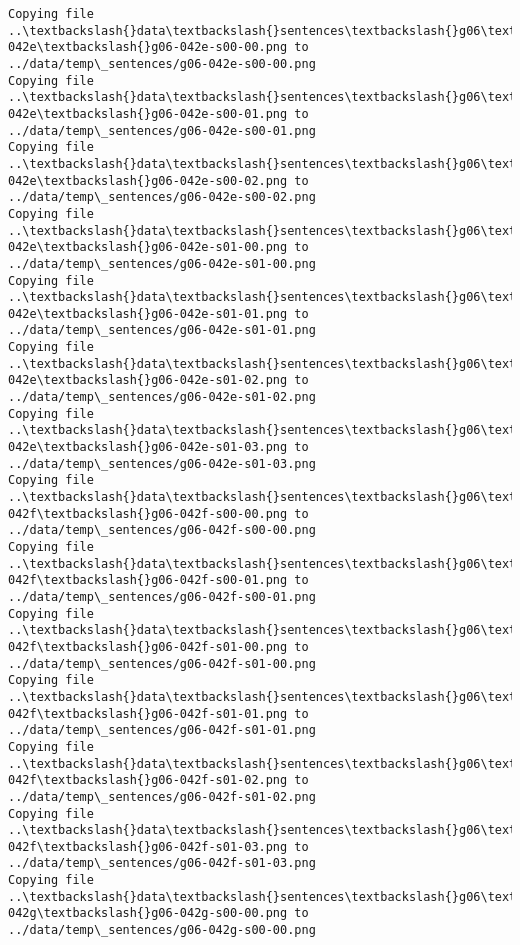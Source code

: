 \documentclass[11pt]{article}
\begin{document}
\begin{Verbatim}[commandchars=\\\{\}]
Copying file ..\textbackslash{}data\textbackslash{}sentences\textbackslash{}g06\textbackslash{}g06-042e\textbackslash{}g06-042e-s00-00.png to
../data/temp\_sentences/g06-042e-s00-00.png
Copying file ..\textbackslash{}data\textbackslash{}sentences\textbackslash{}g06\textbackslash{}g06-042e\textbackslash{}g06-042e-s00-01.png to
../data/temp\_sentences/g06-042e-s00-01.png
Copying file ..\textbackslash{}data\textbackslash{}sentences\textbackslash{}g06\textbackslash{}g06-042e\textbackslash{}g06-042e-s00-02.png to
../data/temp\_sentences/g06-042e-s00-02.png
Copying file ..\textbackslash{}data\textbackslash{}sentences\textbackslash{}g06\textbackslash{}g06-042e\textbackslash{}g06-042e-s01-00.png to
../data/temp\_sentences/g06-042e-s01-00.png
Copying file ..\textbackslash{}data\textbackslash{}sentences\textbackslash{}g06\textbackslash{}g06-042e\textbackslash{}g06-042e-s01-01.png to
../data/temp\_sentences/g06-042e-s01-01.png
Copying file ..\textbackslash{}data\textbackslash{}sentences\textbackslash{}g06\textbackslash{}g06-042e\textbackslash{}g06-042e-s01-02.png to
../data/temp\_sentences/g06-042e-s01-02.png
Copying file ..\textbackslash{}data\textbackslash{}sentences\textbackslash{}g06\textbackslash{}g06-042e\textbackslash{}g06-042e-s01-03.png to
../data/temp\_sentences/g06-042e-s01-03.png
Copying file ..\textbackslash{}data\textbackslash{}sentences\textbackslash{}g06\textbackslash{}g06-042f\textbackslash{}g06-042f-s00-00.png to
../data/temp\_sentences/g06-042f-s00-00.png
Copying file ..\textbackslash{}data\textbackslash{}sentences\textbackslash{}g06\textbackslash{}g06-042f\textbackslash{}g06-042f-s00-01.png to
../data/temp\_sentences/g06-042f-s00-01.png
Copying file ..\textbackslash{}data\textbackslash{}sentences\textbackslash{}g06\textbackslash{}g06-042f\textbackslash{}g06-042f-s01-00.png to
../data/temp\_sentences/g06-042f-s01-00.png
Copying file ..\textbackslash{}data\textbackslash{}sentences\textbackslash{}g06\textbackslash{}g06-042f\textbackslash{}g06-042f-s01-01.png to
../data/temp\_sentences/g06-042f-s01-01.png
Copying file ..\textbackslash{}data\textbackslash{}sentences\textbackslash{}g06\textbackslash{}g06-042f\textbackslash{}g06-042f-s01-02.png to
../data/temp\_sentences/g06-042f-s01-02.png
Copying file ..\textbackslash{}data\textbackslash{}sentences\textbackslash{}g06\textbackslash{}g06-042f\textbackslash{}g06-042f-s01-03.png to
../data/temp\_sentences/g06-042f-s01-03.png
Copying file ..\textbackslash{}data\textbackslash{}sentences\textbackslash{}g06\textbackslash{}g06-042g\textbackslash{}g06-042g-s00-00.png to
../data/temp\_sentences/g06-042g-s00-00.png

\end{Verbatim}
\end{document}
